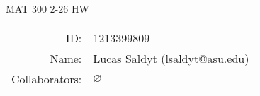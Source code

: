 \documentclass[notitlepage]{homework}
\author{Lucas Saldyt}
\title{\AssignmentName}
\newcommand{\AssignmentName}{MAT 300 2-26 HW}
\begin{document}

\begin{titlepage}
	\begin{center}
		{\Large \AssignmentName}
		
		\bigskip

		\begin{tabular}{rl}
			ID: & 1213399809 \\ %
            Name: & Lucas Saldyt (lsaldyt@asu.edu) \\ %
			Collaborators: & $\varnothing$
		\end{tabular}

		\bigskip

	\end{center}

	\toccontents

	\vfill

\end{titlepage}







\end{document}
